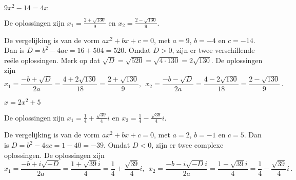 \documentclass{ximera}
\begin{document}
\begin{exercise}
\begin{question}
$ 9x^2 - 14 = 4x$
\begin{oplossing}
De oplossingen zijn $x_1 = \frac{2 + \sqrt{130}}{9}$ en $x_2 = \frac{2 - \sqrt{130}}{9}$.

De vergelijking is van de vorm $ax^2 + bx + c = 0$, met $a=9$, $b=-4$ en $c=-14$. Dan is $D = b^2 - 4ac = 16 + 504 = 520$. Omdat $D > 0$, zijn er twee verschillende reële oplossingen. Merk op dat $\sqrt{D} = \sqrt{520} = \sqrt{4 \cdot 130} = 2 \sqrt{130}$. De oplossingen zijn
$$
x_1 = \frac{-b + \sqrt{D}}{2a} = \frac{4 + 2 \sqrt{130}}{18} = \frac{2 + \sqrt{130}}{9}, \ \ x_2 = \frac{-b - \sqrt{D}}{2a} = \frac{4 - 2 \sqrt{130}}{18} = \frac{2 - \sqrt{130}}{9}\, .
$$
\end{oplossing}
\end{question}

\begin{question}
$ x = 2x^2 + 5$
\begin{oplossing}
De oplossingen zijn $x_1 = \frac{1}{4} + \frac{\sqrt{39}}{4} i$ en $x_2 = \frac{1}{4} - \frac{\sqrt{39}}{4} i$.

 De vergelijking is van de vorm $ax^2 + bx + c = 0$, met $a=2$, $b=-1$ en $c=5$. Dan is $D = b^2 - 4ac = 1 - 40 = -39$. Omdat $D < 0$, zijn er twee complexe oplossingen. De oplossingen zijn
$$
x_1 = \frac{-b + i\sqrt{-D}}{2a} = \frac{1 + \sqrt{39}i}{4} = \frac{1}{4} + \frac{\sqrt{39}}{4} i, \ \ x_2 = \frac{-b - i\sqrt{-D}i}{2a} = \frac{1 - \sqrt{39}i}{4} = \frac{1}{4} - \frac{\sqrt{39}}{4} i \, .
$$
\end{oplossing}
\end{question}
\end{exercise}
\end{document}
